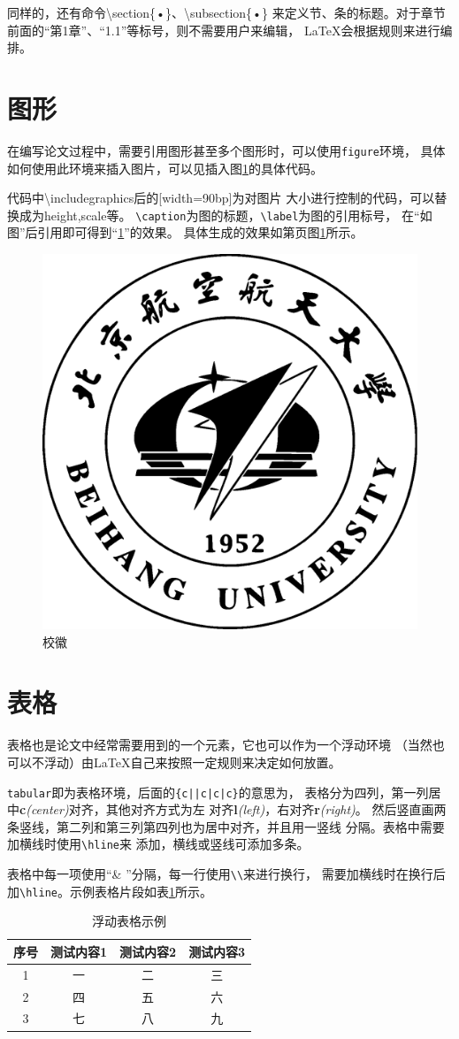 同样的，还有命令\textbackslash section\{•\}、\textbackslash subsection\{•\}
来定义节、条的标题。对于章节前面的“第1章”、“1.1”等标号，则不需要用户来编辑，
\LaTeX{}会根据规则来进行编排。

\section{图形}
\label{sec-figure}
在编写论文过程中，需要引用图形甚至多个图形时，可以使用\texttt{figure}环境，
具体如何使用此环境来插入图片，可以见插入图\ref{sample-figbuaamark}的具体代码。

代码中\textbackslash includegraphics后的[width=90bp]为对图片
大小进行控制的代码，可以替换成为height,scale等。
\verb|\caption|为图的标题，\verb|\label|为图的引用标号，
在“如图”后引用即可得到“\ref{sample-figbuaamark}”的效果。
具体生成的效果如第\pageref{sample-figbuaamark}页图\ref{sample-figbuaamark}所示。

\begin{figure}
\begin{center}
\includegraphics[width=90bp]{figure/buaamark.eps}
\caption{校徽\label{sample-figbuaamark}}
\end{center}
\end{figure}

\section{表格}
\label{sec-table}
表格也是论文中经常需要用到的一个元素，它也可以作为一个浮动环境
（当然也可以不浮动）由\LaTeX{}自己来按照一定规则来决定如何放置。

\texttt{tabular}即为表格环境，后面的\texttt{\{c||c|c|c\}}的意思为，
表格分为四列，第一列居中{\bf c}\textit{(center)}对齐，其他对齐方式为左
对齐{\bf l}\textit{(left)}，右对齐{\bf r}\textit{(right)}。
然后竖直画两条竖线，第二列和第三列第四列也为居中对齐，并且用一竖线
分隔。表格中需要加横线时使用\verb|\hline|来
添加，横线或竖线可添加多条。

表格中每一项使用“\& ”分隔，每一行使用\verb|\\|来进行换行，
需要加横线时在换行后加\verb|\hline|。示例表格片段如表\ref{tab-test3}所示。
\begin{table}
\begin{center}
\caption{浮动表格示例\label{tab-test3}}
\begin{tabular}{c||c|c|c}
\hline
序号&测试内容1&测试内容2&测试内容3\\
\hline \hline
1 & 一 & 二 & 三\\\hline
2 & 四 & 五 & 六\\\hline
3 & 七 & 八 & 九\\\hline
\end{tabular}
\end{center}
\end{table}

